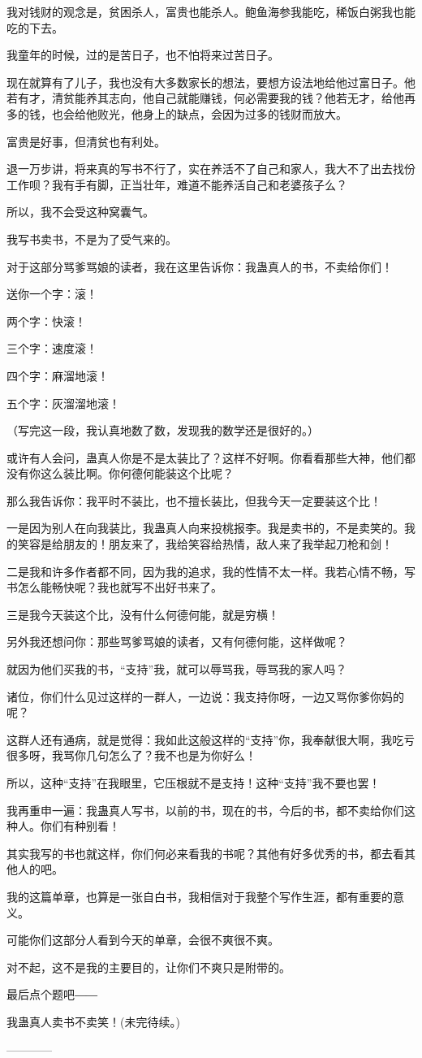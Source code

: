 \begin{this_body}
我对钱财的观念是，贫困杀人，富贵也能杀人。鲍鱼海参我能吃，稀饭白粥我也能吃的下去。

我童年的时候，过的是苦日子，也不怕将来过苦日子。

现在就算有了儿子，我也没有大多数家长的想法，要想方设法地给他过富日子。他若有才，清贫能养其志向，他自己就能赚钱，何必需要我的钱？他若无才，给他再多的钱，也会给他败光，他身上的缺点，会因为过多的钱财而放大。

富贵是好事，但清贫也有利处。

退一万步讲，将来真的写书不行了，实在养活不了自己和家人，我大不了出去找份工作呗？我有手有脚，正当壮年，难道不能养活自己和老婆孩子么？

所以，我不会受这种窝囊气。

我写书卖书，不是为了受气来的。

对于这部分骂爹骂娘的读者，我在这里告诉你：我蛊真人的书，不卖给你们！

送你一个字：滚！

两个字：快滚！

三个字：速度滚！

四个字：麻溜地滚！

五个字：灰溜溜地滚！

（写完这一段，我认真地数了数，发现我的数学还是很好的。）

或许有人会问，蛊真人你是不是太装比了？这样不好啊。你看看那些大神，他们都没有你这么装比啊。你何德何能装这个比呢？

那么我告诉你：我平时不装比，也不擅长装比，但我今天一定要装这个比！

一是因为别人在向我装比，我蛊真人向来投桃报李。我是卖书的，不是卖笑的。我的笑容是给朋友的！朋友来了，我给笑容给热情，敌人来了我举起刀枪和剑！

二是我和许多作者都不同，因为我的追求，我的性情不太一样。我若心情不畅，写书怎么能畅快呢？我也就写不出好书来了。

三是我今天装这个比，没有什么何德何能，就是穷横！

另外我还想问你：那些骂爹骂娘的读者，又有何德何能，这样做呢？

就因为他们买我的书，“支持”我，就可以辱骂我，辱骂我的家人吗？

诸位，你们什么见过这样的一群人，一边说：我支持你呀，一边又骂你爹你妈的呢？

这群人还有通病，就是觉得：我如此这般这样的“支持”你，我奉献很大啊，我吃亏很多呀，我骂你几句怎么了？我不也是为你好么！

所以，这种“支持”在我眼里，它压根就不是支持！这种“支持”我不要也罢！

我再重申一遍：我蛊真人写书，以前的书，现在的书，今后的书，都不卖给你们这种人。你们有种别看！

其实我写的书也就这样，你们何必来看我的书呢？其他有好多优秀的书，都去看其他人的吧。

我的这篇单章，也算是一张自白书，我相信对于我整个写作生涯，都有重要的意义。

可能你们这部分人看到今天的单章，会很不爽很不爽。

对不起，这不是我的主要目的，让你们不爽只是附带的。

最后点个题吧――

我蛊真人卖书不卖笑！(未完待续。)

------------

\end{this_body}


